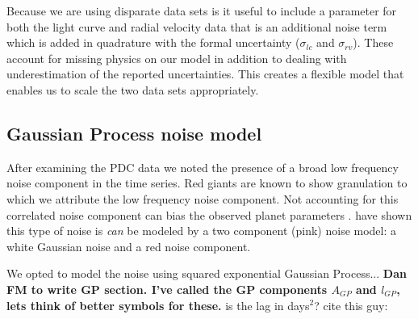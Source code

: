 \documentclass[apjl]{emulateapj}
\begin{document}
Because we are using disparate data sets is it useful to include a parameter for both the light curve and radial velocity data that is an additional noise term which is added in quadrature with the formal uncertainty ($\sigma_{lc}$ and $\sigma_{rv}$). These account for missing physics on our model in addition to dealing with underestimation of the reported uncertainties. This creates a flexible model that enables us to scale the two data sets appropriately.

\subsection{Gaussian Process noise model}
After examining the PDC data we noted the presence of a broad low frequency noise component in the time series. Red giants are known to show granulation \citep{mathur11} to which we attribute the low frequency noise component. Not accounting for this correlated noise component can bias the observed planet parameters \citep{carter09}. \citet{huber13b} have shown this type of noise is \emph{can} be modeled by a two component (pink) noise model: a white Gaussian noise and a red noise component.

We opted to model the noise using squared exponential Gaussian Process... \textbf{Dan FM to write GP section. I've called the GP components $A_{GP}$ and $l_{GP}$, lets think of better symbols for these.}
is the lag in days$^2$?
cite this guy: \citet{ambikasaran14}

\end{document}
